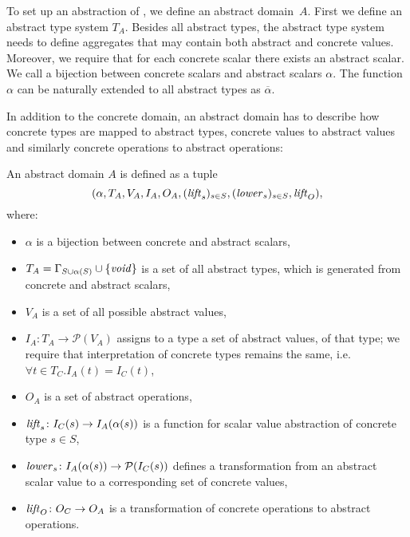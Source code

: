 To set up an abstraction of \LLVM, we define an abstract domain~$A$. First we
define an abstract type system $T_A$. Besides all abstract types, the abstract type
system needs to define aggregates that may contain both abstract and concrete
values. Moreover, we require that for each concrete scalar there exists an abstract scalar.
We call a bijection between concrete scalars and abstract scalars $\alpha$. The
function $\alpha$ can be naturally extended to all abstract types as $\overline{\alpha}$.

In addition to the concrete domain, an abstract domain has to describe how concrete
types are mapped to abstract types, concrete values to abstract values and
similarly concrete operations to abstract operations:
\begin{definition}
    An abstract domain $A$ is defined as a tuple
    \[(\alpha, T_A, V_A, I_A, O_A, (\mathit{lift}_s)_{s \in S}, (\mathit{lower}_s)_{s \in
    S}, \mathit{lift}_O),\] where:
\begin{itemize}
    \item $\alpha$ is a bijection between concrete and abstract scalars,
    \item $T_A = \Gamma_{S \cup \alpha( S )} \cup \{\mathit{void}\}$ is a set of all abstract types,
        which is generated from concrete and abstract scalars,
    \item $V_A$ is a set of all possible abstract values,
    \item $I_A \colon T_A \to \mathcal{P}(V_A)$ assigns to a type a set of
        abstract values, of that type; we require that interpretation of
        concrete types remains the same, i.e.~$\forall t \in T_C . I_A( t ) =
        I_C( t )$,
    \item $O_A$ is a set of abstract operations,
    \item $\mathit{lift}_s \colon I_C( s ) \to I_A( \alpha( s ) )$ is a function
        for scalar value abstraction of concrete type $s \in S$,
    \item $\mathit{lower}_s \colon I_A( \alpha( s ) ) \to \mathcal{P}( I_C( s ) )$ defines a
        transformation from an abstract scalar value to a corresponding set of concrete values,
    \item $\mathit{lift}_O \colon O_C \to O_A$ is a transformation of
        concrete operations to abstract operations.
\end{itemize}
\end{definition}

